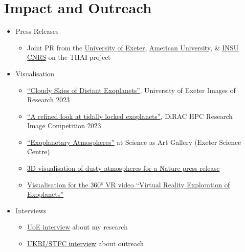 \documentclass[a4paper, 11pt]{article}
\begin{document}
\section{Impact and Outreach}
\begin{itemize}[nosep, leftmargin=10pt]
    \item Press Releases
    \begin{itemize}
        \item Joint PR from the \href{https://www.exeter.ac.uk/research/news/articles/questtouncoverintricacies.html}{University of Exeter}, \href{https://www.american.edu/news/20220811-trappist-1.cfm}{American University}, \& \href{https://www.insu.cnrs.fr/fr/cnrsinfo/la-quete-pour-percer-le-mystere-des-climats-de-planetes-similaires-la-terre-avance}{INSU CNRS} on the THAI project
    \end{itemize}
    \item Visualisation
    \begin{itemize}
        \item \href{https://issuu.com/universityofexeter/docs/images_of_research_2023}{``Cloudy Skies of Distant Exoplanets''}, University of Exeter Images of Research 2023
        \item \href{https://dirac.ac.uk/research-image-competition-2023}{``A refined look at tidally locked exoplanets''}, DiRAC HPC Research Image Competition 2023
        \item \href{https://exetersciencecentre.org/gallery/denis_sergeev_uoe_exoplanets}{``Exoplanetary Atmospheres''} at Science as Art Gallery (Exeter Science Centre)
        \item \href{https://phys.org/news/2020-06-presence-airborne-signify-habitability-distant.html}{3D visualisation of dusty atmospheres for a Nature press release}
        \item \href{https://youtu.be/Vnke9dWofR8&t=180}{Visualisation for the 360° VR video ``Virtual Reality Exploration of Exoplanets''}
    \end{itemize}
    \item Interviews
    \begin{itemize}
        \item \href{https://youtu.be/_Aus842EZWk}{UoE interview} about my research
        \item \href{https://youtu.be/PzQSfCwp0B8}{UKRI/STFC interview} about outreach

\end{itemize}
\end{itemize}
\end{document}
